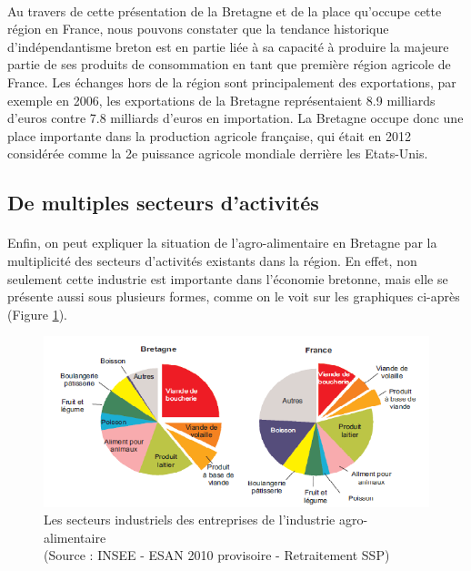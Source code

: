 \documentclass[a4paper,12pt]{report}
\begin{document}
			\paragraph{}Au travers de cette présentation de la Bretagne et de la place qu’occupe cette région en France, nous pouvons constater que la tendance historique d’indépendantisme breton est en partie liée à sa capacité à produire la majeure partie de ses produits de consommation en tant que première région agricole de France. Les échanges hors de la région sont principalement des exportations, par exemple en 2006, les exportations de la Bretagne représentaient 8.9 milliards d’euros contre 7.8 milliards d’euros en importation. La Bretagne occupe donc une place importante dans la production agricole française, qui était en 2012 considérée comme la 2e puissance agricole mondiale derrière les Etats-Unis.
			
		\subsection{De multiples secteurs d'activités}
			\paragraph{}Enfin, on peut expliquer la situation de l'agro-alimentaire en Bretagne par la multiplicité des secteurs d'activités existants dans la région. En effet, non seulement cette industrie est importante dans l'économie bretonne, mais elle se présente aussi sous plusieurs formes, comme on le voit sur les graphiques ci-après (Figure \ref{SecteursIndustrielsIAA}).
			
			\begin{figure}[!h]
			\centering
			\includegraphics[scale=1]{Illustrations/SecteursIndustrielsIAA.png}
			\caption{Les secteurs industriels des entreprises de l'industrie agro-alimentaire\\(Source : INSEE - ESAN 2010 provisoire - Retraitement SSP)}
			\label{SecteursIndustrielsIAA}
			\end{figure}
			
\end{document}

